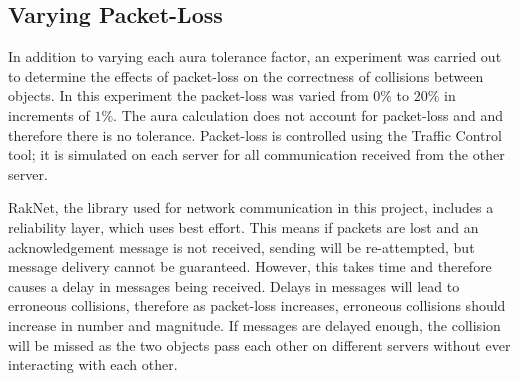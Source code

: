 




\subsection{Varying Packet-Loss}

In addition to varying each aura tolerance factor, an experiment was carried out to determine the effects of packet-loss on the correctness of collisions between objects. In this experiment the packet-loss was varied from $0\%$ to $20\%$ in increments of $1\%$. The aura calculation does not account for packet-loss and and therefore there is no tolerance. Packet-loss is controlled using the Traffic Control tool; it is simulated on each server for all communication received from the other server.

RakNet, the library used for network communication in this project, includes a reliability layer, which uses best effort. This means if packets are lost and an acknowledgement message is not received, sending will be re-attempted, but message delivery cannot be guaranteed. However, this takes time and therefore causes a delay in messages being received. Delays in messages will lead to erroneous collisions, therefore as packet-loss increases, erroneous collisions should increase in number and magnitude. If messages are delayed enough, the collision will be missed as the two objects pass each other on different servers without ever interacting with each other. 

